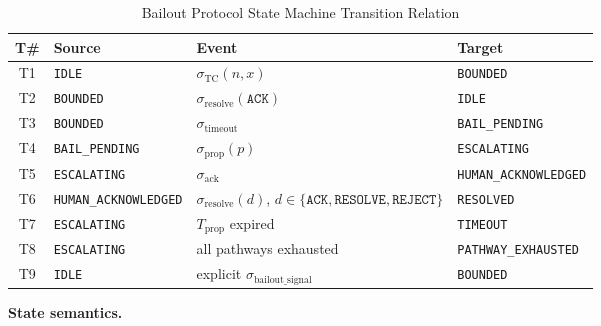 \begin{table}[t]
\caption{Bailout Protocol State Machine Transition Relation}
\label{tab:bp-transitions}
\medskip
\noindent\begin{tabular}{clll}
\toprule
\textbf{T\#} & \textbf{Source} & \textbf{Event} & \textbf{Target} \\
\midrule
T1 & \texttt{IDLE}         & $\sigma_{\text{TC}}(n, x)$           & \texttt{BOUNDED}       \\
T2 & \texttt{BOUNDED}       & $\sigma_{\text{resolve}}(\texttt{ACK})$ & \texttt{IDLE}         \\
T3 & \texttt{BOUNDED}       & $\sigma_{\text{timeout}}$            & \texttt{BAIL\_PENDING} \\
T4 & \texttt{BAIL\_PENDING} & $\sigma_{\text{prop}}(p)$            & \texttt{ESCALATING}    \\
T5 & \texttt{ESCALATING}   & $\sigma_{\text{ack}}$                & \texttt{HUMAN\_ACKNOWLEDGED} \\
T6 & \texttt{HUMAN\_ACKNOWLEDGED} & $\sigma_{\text{resolve}}(d)$, $d \in \{\texttt{ACK}, \texttt{RESOLVE}, \texttt{REJECT}\}$ & \texttt{RESOLVED} \\
T7 & \texttt{ESCALATING}   & $T_{\text{prop}}$ expired            & \texttt{TIMEOUT}      \\
T8 & \texttt{ESCALATING}   & all pathways exhausted               & \texttt{PATHWAY\_EXHAUSTED} \\
T9 & \texttt{IDLE}         & explicit $\sigma_{\text{bailout\_signal}}$ & \texttt{BOUNDED} \\
\midrule
\end{tabular}
\end{table}

\medskip
\noindent\textbf{State semantics.}

